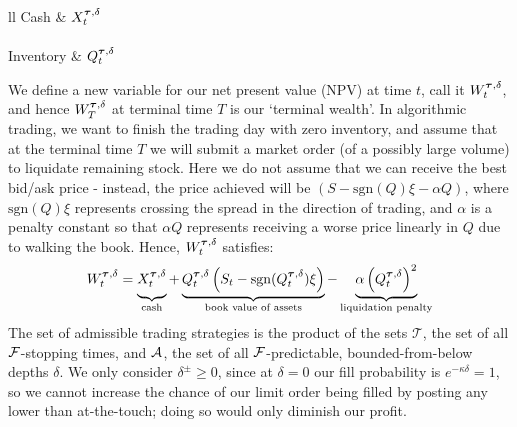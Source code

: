 \begin{longtable}{ll}
Cash & $X^{\bm{\tau}, \delta}_t$ \\
  \vspace{6pt} \\ 
Inventory & $Q^{\bm{\tau}, \delta}_t$ \\
\end{longtable}

We define a new variable for our net present value (NPV) at time $t$, call it $W^{\bm{\tau}, \delta}_t$, and hence $W^{\bm{\tau}, \delta}_T$ at terminal time $T$ is our `terminal wealth'. In algorithmic trading, we want to finish the trading day with zero inventory, and assume that at the terminal time $T$ we will submit a market order (of a possibly large volume) to liquidate remaining stock. Here we do not assume that we can receive the best bid/ask price - instead, the price achieved will be $(S - \mathrm{sgn}(Q)\xi - \alpha Q)$, where $\mathrm{sgn}(Q)\xi$ represents crossing the spread in the direction of trading, and $\alpha$ is a penalty constant so that $\alpha Q$ represents receiving a worse price linearly in $Q$ due to walking the book. Hence, $W^{\bm{\tau}, \delta}_t$ satisfies:
\begin{equation}\label{eq:terminalwealth}
W^{\btau, \delta}_t = \underbrace{\vphantom{\left( Q^{\btau, \delta}_t) \right)}X^{\btau, \delta}_t}_{\text{cash}}+ \underbrace{Q^{\btau, \delta}_t \left( S_t - \mathrm{sgn}(Q^{\btau, \delta}_t)\xi \right)}_{\text{book value of assets}} - \underbrace{\alpha \left( Q^{\btau, \delta}_t \right)^2}_{\text{liquidation penalty}}
\end{equation}
The set of admissible trading strategies is the product of the sets $\mathcal{T}$, the set of all $\mathcal{F}$-stopping times, and $\mathcal{A}$, the set of all $\mathcal{F}$-predictable, bounded-from-below depths $\delta$. We only consider $\delta^\pm \geq 0$, since at $\delta=0$ our fill probability is $e^{-\kappa\delta}=1$, so we cannot increase the chance of our limit order being filled by posting any lower than at-the-touch; doing so would only diminish our profit.

